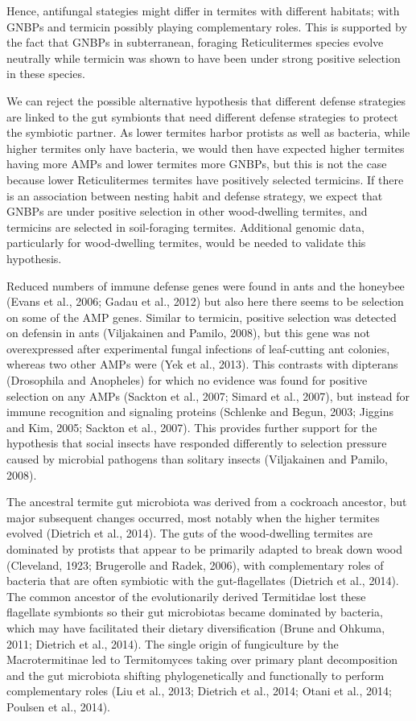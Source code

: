 \documentclass[11pt]{article}
\begin{document}
\begin{sloppypar}
Hence, antifungal stategies might differ in termites with different habitats; with GNBPs and termicin possibly playing complementary roles. 
This is supported by the fact that GNBPs in subterranean, foraging Reticulitermes species evolve neutrally while termicin was shown to have been under strong positive selection in these species.
\par
We can reject the possible alternative hypothesis that different defense strategies are linked to the gut symbionts that need different defense strategies to protect the symbiotic partner. 
As lower termites harbor protists as well as bacteria, while higher termites only have bacteria, we would then have expected higher termites having more AMPs and lower termites more GNBPs, but this is not the case because lower Reticulitermes termites have positively selected termicins. 
If there is an association between nesting habit and defense strategy, we expect that GNBPs are under positive selection in other wood-dwelling termites, and termicins are selected in soil-foraging termites. 
Additional genomic data, particularly for wood-dwelling termites, would be needed to validate this hypothesis.
\par
Reduced numbers of immune defense genes were found in ants and the honeybee (Evans et al., 2006; Gadau et al., 2012) but also here there seems to be selection on some of the AMP genes. Similar to termicin, positive selection was detected on defensin in ants (Viljakainen and Pamilo, 2008), but this gene was not overexpressed after experimental fungal infections of leaf-cutting ant colonies, whereas two other AMPs were (Yek et al., 2013). This contrasts with dipterans (Drosophila and Anopheles) for which no evidence was found for positive selection on any AMPs (Sackton et al., 2007; Simard et al., 2007), but instead for immune recognition and signaling proteins (Schlenke and Begun, 2003; Jiggins and Kim, 2005; Sackton et al., 2007). This provides further support for the hypothesis that social insects have responded differently to selection pressure caused by microbial pathogens than solitary insects (Viljakainen and Pamilo, 2008).
\par
The ancestral termite gut microbiota was derived from a cockroach ancestor, but major subsequent changes occurred, most notably when the higher termites evolved (Dietrich et al., 2014). The guts of the wood-dwelling termites are dominated by protists that appear to be primarily adapted to break down wood (Cleveland, 1923; Brugerolle and Radek, 2006), with complementary roles of bacteria that are often symbiotic with the gut-flagellates (Dietrich et al., 2014). The common ancestor of the evolutionarily derived Termitidae lost these flagellate symbionts so their gut microbiotas became dominated by bacteria, which may have facilitated their dietary diversification (Brune and Ohkuma, 2011; Dietrich et al., 2014). The single origin of fungiculture by the Macrotermitinae led to Termitomyces taking over primary plant decomposition and the gut microbiota shifting phylogenetically and functionally to perform complementary roles (Liu et al., 2013; Dietrich et al., 2014; Otani et al., 2014; Poulsen et al., 2014).

\end{sloppypar}
\end{document}
